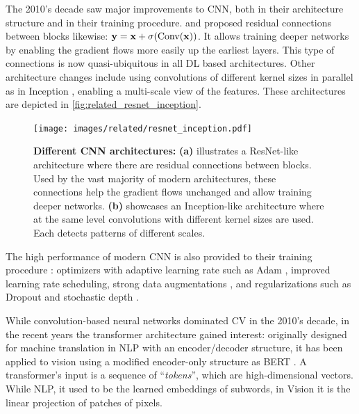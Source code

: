 The 2010's decade saw major improvements to \acs{CNN}, both in their architecture structure and in
their training procedure. \cite{srivastava2015highwaynet} and \cite{he2016resnet} proposed residual
connections between blocks likewise: $\mathbf{y} = \mathbf{x} + \sigma(\operatorname{Conv}(\mathbf{x}))$. It allows
training deeper networks by enabling the gradient flows more easily up the earliest layers. This
type of connections is now quasi-ubiquitous in all \ac{DL} based architectures. Other architecture
changes include using convolutions of different kernel sizes in parallel as in Inception
\citep{szegedy2015inception}, enabling a multi-scale view of the features. These architectures are
depicted in \autoref{fig:related_resnet_inception}.

\begin{figure}[tb]
      \begin{center}
            \texttt{[image: images/related/resnet\_inception.pdf]}
      \end{center}
      \caption{\textbf{Different CNN architectures:} \textbf{(a)} illustrates a ResNet-like architecture
            \citep{he2016resnet} where there are residual connections between blocks. Used by the vast
            majority of modern architectures, these connections help the gradient flows unchanged and
            allow training deeper networks. \textbf{(b)} showcases an Inception-like architecture where at
            the same level convolutions with different kernel sizes are used. Each detects patterns of
            different scales.}
      \label{fig:related_resnet_inception}
\end{figure}

The high performance of modern \acs{CNN} is also provided to their training procedure
\citep{wightman2019resnetstrikesback}: optimizers with adaptive learning rate such as Adam
\citep{kingma2014adam}, improved learning rate scheduling, strong data augmentations
\citep{muller2021trivialaugment,hingyi2018mixup,zhong2017erasing}, and regularizations such as
Dropout \citep{gal2016dropout} and stochastic depth \citep{gao2016stochasticdepth}.

While convolution-based neural networks dominated \acf{CV} in the 2010's decade, in the recent years
the transformer architecture gained interest: originally designed for machine translation in
\ac{NLP} \citep{vaswani2017transformer} with an encoder/decoder structure, it has been applied to
vision \citep{dosovitskiy2020vit} using a modified encoder-only structure as BERT
\citep{devlin2018bert}. A transformer's input is a sequence of ``\textit{tokens}'', which are
high-dimensional vectors. While \ac{NLP}, it used to be the learned embeddings of subwords, in
Vision it is the linear projection of patches of pixels.


